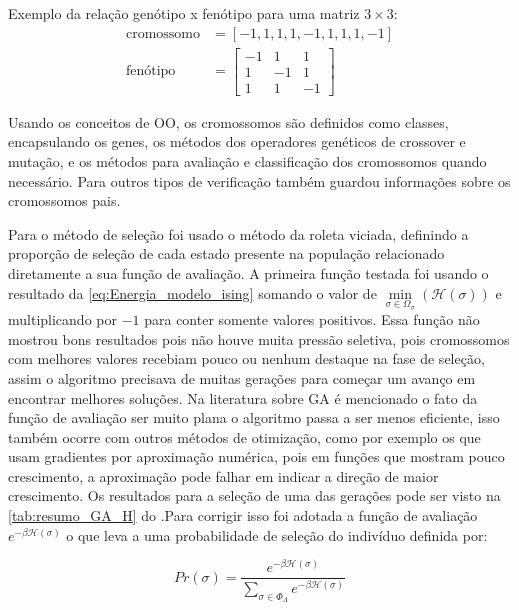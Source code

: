 Exemplo da relação genótipo x fenótipo para uma matriz \( 3 \times 3 \):
\begin{align*}
\text{cromossomo} &= \left[-1, 1, 1, 1, -1, 1, 1, 1, -1 \right]\\
\text{fenótipo} &= \begin{bmatrix}
-1 & 1 & 1 \\
1 & -1 & 1 \\
1 & 1 & -1
\end{bmatrix}
\end{align*}

Usando os conceitos de OO, os cromossomos são definidos como classes, encapsulando os genes, os métodos dos operadores genéticos de crossover e mutação, e os métodos para avaliação e classificação dos cromossomos quando necessário. Para outros tipos de verificação também guardou informações sobre os cromossomos pais.

Para o método de seleção foi usado o método da roleta viciada, definindo a proporção de seleção de cada estado presente na população relacionado diretamente a sua função de avaliação. A primeira função testada foi usando o resultado da \autoref{eq:Energia_modelo_ising} somando o valor de \(\min\limits_{\sigma \in \Omega_{\sigma}}(\mathcal{H}(\sigma))\) e multiplicando por \(-1\) para conter somente valores positivos. Essa função não mostrou bons resultados pois não houve muita pressão seletiva, pois cromossomos com melhores valores recebiam pouco ou nenhum destaque na fase de seleção, assim o algoritmo precisava de muitas gerações para começar um avanço em encontrar melhores soluções. Na literatura sobre GA é mencionado o fato da função de avaliação ser muito plana o algoritmo passa a ser menos eficiente, isso também ocorre com outros métodos de otimização, como por exemplo os que usam gradientes por aproximação numérica, pois em funções que mostram pouco crescimento, a aproximação pode falhar em indicar a direção de maior crescimento. Os resultados para a seleção de uma das gerações pode ser visto na \autoref{tab:resumo_GA_H} do  .Para corrigir isso foi adotada a função de avaliação \(e^{-\beta \mathcal{H}(\sigma)} \) o que leva a uma probabilidade de seleção do indivíduo definida por:

\begin{equation}
Pr(\sigma) = \frac{e^{-\beta \mathcal{H}(\sigma)}}{\sum_{\sigma \in \Phi_{\Lambda}}e^{-\beta \mathcal{H}(\sigma)}}
\label{eq:selecao_modelo_ising}
\end{equation}


